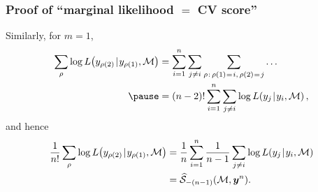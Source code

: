 \documentclass[18pt]{beamer}
\newcommand{\defineTightSpacing}{%
	\setlength{\abovedisplayskip}{.25\baselineskip}%
	\setlength{\belowdisplayskip}{.25\baselineskip}%
}
\newcommand{\given}{\thinnerspace | \thinnerspace}
\newcommand{\spacedEq}{\mkern 1mu = \mkern 1.5mu}
\newcommand{\thinnerspace}{\mskip.5\thinmuskip}
\newcommand{\likelihood}{L}
\newcommand{\by}{\bm{y}}
\newcommand{\score}{\mathcal{S}}
\newcommand{\modelSymbol}{\mathcal{M}}
\newcommand{\permutation}{\rho}
\newcommand{\trainingSize}{m}
\newcommand{\testSampleIndex}{i}
\begin{document}
\begin{frame}
\frametitle{Proof of ``marginal likelihood $=$ {\large CV} score''}
Similarly, for $\trainingSize = 1$,  
\begin{equation*} \defineTightSpacing%
\begin{aligned}
\sum_\permutation \log \likelihood\!\left(y_{\permutation(2)} \given y_{\permutation(1)}, \modelSymbol \right) 
	& = \sum_{\testSampleIndex = 1}^n \sum_{j \neq \testSampleIndex} \sum_{\permutation \thinnerspace : \, \permutation(1) \spacedEq i, \, \permutation(2) \spacedEq j} \ldots \\
	\pause
	&= (n - 2)! \sum_{\testSampleIndex = 1}^n \sum_{j \neq \testSampleIndex} \log \likelihood\!\left(y_j \given y_\testSampleIndex, \modelSymbol \right),
\end{aligned}
\end{equation*}
\pause
and hence
\begin{equation*} \defineTightSpacing%
\begin{aligned}
\frac{1}{n!} \sum_\permutation
	 \log \likelihood\!\left(y_{\permutation(2)} \given y_{\permutation(1)}, \modelSymbol \right)
	&= \frac{1}{n} \sum_{\testSampleIndex = 1}^n \frac{1}{n - 1} \sum_{j \neq \testSampleIndex} \log \likelihood\!\left(y_j \given y_\testSampleIndex, \modelSymbol \right) \\
	&= \widehat{\score}_{-(n - 1)}(\modelSymbol, \by^n).
\end{aligned}
\end{equation*}
\end{frame}
\end{document}

